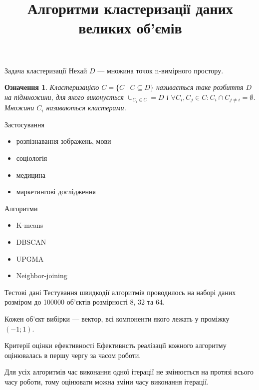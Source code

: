 \documentclass{beamer}
\title{Алгоритми кластеризації даних великих об’ємів}
\date{}
\newtheorem{defn}{Означення}
\begin{document}
    \begin{frame}
        \maketitle
    \end{frame}

    \begin{frame}{Задача кластеризації}
        Нехай $D$ --- множина точок n-вимірного простору. 
        \begin{defn}
            \emph{Кластеризацією} $C = \{C \mid C \subseteq D\}$ називається таке розбиття $D$ на підмножини, 
            для якого виконується $\cup_{C_i \in C} = D$ і $\forall C_i, C_j \in C : C_i \cap C_{j \neq i} = \emptyset$. 
            Множини $C_i$ називаються кластерами.
        \end{defn}
    \end{frame}
    
    
    \begin{frame}{Застосування}
        \begin{itemize}
            \item розпізнавання зображень, мови
            \item соціологія
            \item медицина
            \item маркетингові дослідження
        \end{itemize}
    \end{frame}
    
    
    \begin{frame}{Алгоритми}
        \begin{itemize}
            \item K-means
            \item DBSCAN
            \item UPGMA
            \item Neighbor-joining
        \end{itemize}
    \end{frame}
    
    \begin{frame}{Тестові дані}
        Тестування швидкодії алгоритмів проводилось на наборі даних розміром до 100000 об’єктів розмірності 8, 32 та 64.
        
        Кожен об’єкт вибірки --- вектор, всі компоненти якого лежать у проміжку $(-1; 1)$.
    \end{frame}
    
    \begin{frame}{Критерії оцінки ефективності}
        Ефективнсть реалізації кожного алгоритму оцінювалась в першу чергу за часом роботи.
        
        Для усіх алгоритмів час виконання одної ітерації не змінюється на протязі всього часу роботи, тому оцінювати можна зміни часу виконання ітерації.
    \end{frame}
    
\end{document}
